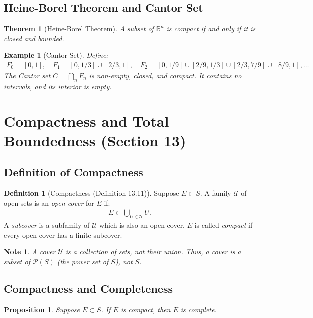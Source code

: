 \documentclass[9pt]{article}
\theoremstyle{definition}
\newtheorem{definition}{Definition}
\theoremstyle{plain}
\newtheorem{theorem}{Theorem}
\newtheorem{proposition}{Proposition}
\newtheorem{example}{Example}
\newtheorem{note}{Note}
\begin{document}
\subsection*{Heine-Borel Theorem and Cantor Set}
\begin{theorem}[Heine-Borel Theorem]
A subset of $ \mathbb{R}^n $ is compact if and only if it is closed and bounded.
\end{theorem}

\begin{example}[Cantor Set]
Define:
\begin{align}
F_0 = [0, 1], \quad F_1 = [0, 1/3] \cup [2/3, 1], \quad F_2 = [0, 1/9] \cup [2/9, 1/3] \cup [2/3, 7/9] \cup [8/9, 1], \dots
\end{align}
The Cantor set $ C = \bigcap_n F_n $ is non-empty, closed, and compact. It contains no intervals, and its interior is empty.
\end{example}
\section*{Compactness and Total Boundedness (Section 13)}

\subsection*{Definition of Compactness}
\begin{definition}[Compactness (Definition 13.11)]
Suppose $ E \subset S $. A family $ \mathcal{U} $ of open sets is an \emph{open cover} for $ E $ if:
\begin{align}
E \subset \bigcup_{U \in \mathcal{U}} U.
\end{align}
A \emph{subcover} is a subfamily of $ \mathcal{U} $ which is also an open cover. $ E $ is called \emph{compact} if every open cover has a finite subcover.
\end{definition}

\begin{note}
A cover $ \mathcal{U} $ is a collection of sets, not their union. Thus, a cover is a subset of $ \mathcal{P}(S) $ (the power set of $ S $), not $ S $.
\end{note}

\subsection*{Compactness and Completeness}
\begin{proposition}
Suppose $ E \subset S $. If $ E $ is compact, then $ E $ is complete.
\end{proposition}
\end{document}
